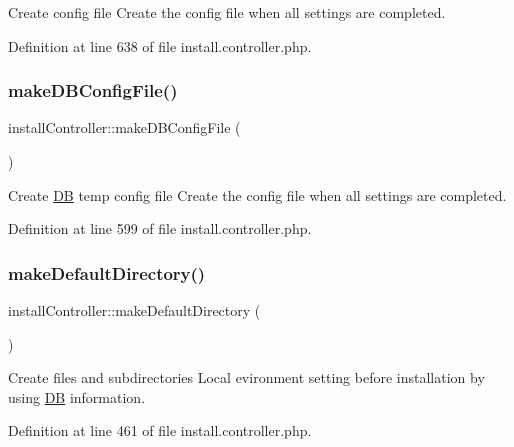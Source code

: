 Create config file Create the config file when all settings are completed. 



Definition at line 638 of file install.\+controller.\+php.

\hypertarget{classinstallController_a65277eeb03f9762ae58dab7570e5310c}{}\label{classinstallController_a65277eeb03f9762ae58dab7570e5310c} 
\subsubsection{\texorpdfstring{make\+D\+B\+Config\+File()}{makeDBConfigFile()}}
{\footnotesize\ttfamily install\+Controller\+::make\+D\+B\+Config\+File (\begin{DoxyParamCaption}{ }\end{DoxyParamCaption})}



Create \hyperlink{classDB}{DB} temp config file Create the config file when all settings are completed. 



Definition at line 599 of file install.\+controller.\+php.

\hypertarget{classinstallController_a5503f7ef0615cbd6b11a6ef4ae13c2c9}{}\label{classinstallController_a5503f7ef0615cbd6b11a6ef4ae13c2c9} 
\subsubsection{\texorpdfstring{make\+Default\+Directory()}{makeDefaultDirectory()}}
{\footnotesize\ttfamily install\+Controller\+::make\+Default\+Directory (\begin{DoxyParamCaption}{ }\end{DoxyParamCaption})}



Create files and subdirectories Local evironment setting before installation by using \hyperlink{classDB}{DB} information. 



Definition at line 461 of file install.\+controller.\+php.

\hypertarget{classinstallController_a87b331e263614e15c5366284648f6ee0}{}\label{classinstallController_a87b331e263614e15c5366284648f6ee0} 
